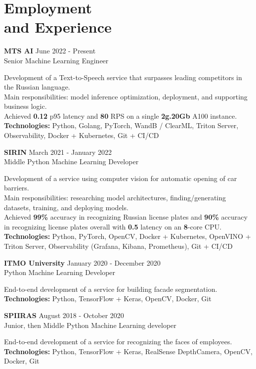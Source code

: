 \section{\sc Employment \\and Experience}
\vspace{2.6pt}

\textbf{MTS AI} \hfill June 2022 - Present \\
Senior Machine Learning Engineer

Development of a Text-to-Speech service that surpasses leading competitors in the Russian language. \\
Main responsibilities: model inference optimization, deployment, and supporting business logic. \\
Achieved \textbf{0.12} p95 latency and \textbf{80} RPS on a single \textbf{2g.20Gb} A100 instance. \\
\textbf{Technologies:} Python, Golang, PyTorch, WandB / ClearML, Triton Server, Observability, Docker + Kubernetes, Git + CI/CD

\textbf{SIRIN} \hfill March 2021 - January 2022 \\
Middle Python Machine Learning Developer

Development of a service using computer vision for automatic opening of car barriers. \\
Main responsibilities: researching model architectures, finding/generating datasets, training, and deploying models. \\
Achieved \textbf{99\%} accuracy in recognizing Russian license plates and \textbf{90\%} accuracy in recognizing license plates overall with \textbf{0.5} latency on an \textbf{8}-core CPU. \\
\textbf{Technologies:} Python, PyTorch, OpenCV, Docker + Kubernetes, OpenVINO + Triton Server, Observability (Grafana, Kibana, Prometheus), Git + CI/CD

\textbf{ITMO University} \hfill January 2020 - December 2020 \\
Python Machine Learning Developer

End-to-end development of a service for building facade segmentation. \\
\textbf{Technologies:} Python, TensorFlow + Keras, OpenCV, Docker, Git

\textbf{SPIIRAS} \hfill August 2018 - October 2020 \\
Junior, then Middle Python Machine Learning developer

End-to-end development of a service for recognizing the faces of employees. \\
\textbf{Technologies:} Python, TensorFlow + Keras, RealSense DepthCamera, OpenCV, Docker, Git

\endinput
